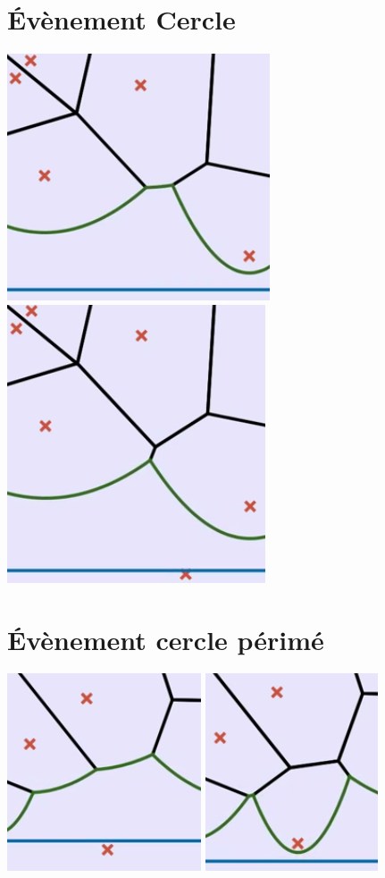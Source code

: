 \documentclass[a4paper, 10pt]{article}
\begin{document}
\begin{center}
\section*{Évènement Cercle}  
\includegraphics[scale=0.9]{AvantCercle.PNG}
\includegraphics[scale=0.8]{ApresCercle.PNG} 
\bigbreak
\section*{Évènement cercle périmé} 
\includegraphics[scale=1]{AvantFauxCercle.PNG}
\includegraphics[scale=1]{ApresFauxCercle.PNG}
\bigbreak

\end{center}
\end{document}
